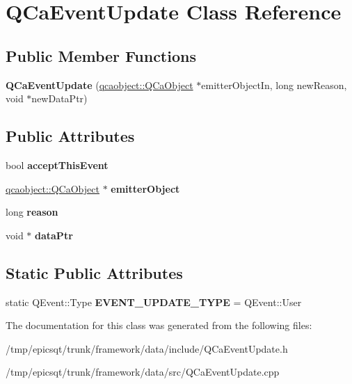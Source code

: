 \hypertarget{classQCaEventUpdate}{
\section{QCaEventUpdate Class Reference}
\label{classQCaEventUpdate}
}
\subsection*{Public Member Functions}
\begin{DoxyCompactItemize}
\item 
\hypertarget{classQCaEventUpdate_ade1dda4ad7bdc729e003d1a888d4b3db}{
{\bfseries QCaEventUpdate} (\hyperlink{classqcaobject_1_1QCaObject}{qcaobject::QCaObject} $\ast$emitterObjectIn, long newReason, void $\ast$newDataPtr)}
\label{classQCaEventUpdate_ade1dda4ad7bdc729e003d1a888d4b3db}

\end{DoxyCompactItemize}
\subsection*{Public Attributes}
\begin{DoxyCompactItemize}
\item 
\hypertarget{classQCaEventUpdate_ae92108dbe65273ab567a34bfc0fbbae7}{
bool {\bfseries acceptThisEvent}}
\label{classQCaEventUpdate_ae92108dbe65273ab567a34bfc0fbbae7}

\item 
\hypertarget{classQCaEventUpdate_a0d7167f26981915db3cc28e53bbb9f55}{
\hyperlink{classqcaobject_1_1QCaObject}{qcaobject::QCaObject} $\ast$ {\bfseries emitterObject}}
\label{classQCaEventUpdate_a0d7167f26981915db3cc28e53bbb9f55}

\item 
\hypertarget{classQCaEventUpdate_a12a82b9464b819a166071f6139acb054}{
long {\bfseries reason}}
\label{classQCaEventUpdate_a12a82b9464b819a166071f6139acb054}

\item 
\hypertarget{classQCaEventUpdate_a49a6f688e0dc88ed1438929905226207}{
void $\ast$ {\bfseries dataPtr}}
\label{classQCaEventUpdate_a49a6f688e0dc88ed1438929905226207}

\end{DoxyCompactItemize}
\subsection*{Static Public Attributes}
\begin{DoxyCompactItemize}
\item 
\hypertarget{classQCaEventUpdate_a2e62dee2c73ab95e03c7672fd4f82202}{
static QEvent::Type {\bfseries EVENT\_\-UPDATE\_\-TYPE} = QEvent::User}
\label{classQCaEventUpdate_a2e62dee2c73ab95e03c7672fd4f82202}

\end{DoxyCompactItemize}


The documentation for this class was generated from the following files:\begin{DoxyCompactItemize}
\item 
/tmp/epicsqt/trunk/framework/data/include/QCaEventUpdate.h\item 
/tmp/epicsqt/trunk/framework/data/src/QCaEventUpdate.cpp\end{DoxyCompactItemize}
